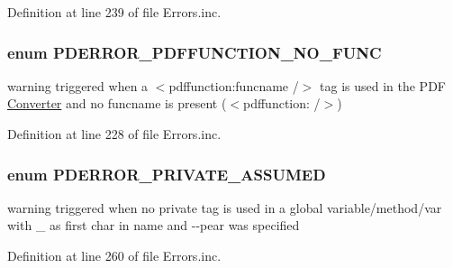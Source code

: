 \-Definition at line 239 of file \-Errors.\-inc.

\hypertarget{_errors_8inc_a8b308ece99eb09568c804c9188cf2409}{
\subsubsection[{\-P\-D\-E\-R\-R\-O\-R\-\_\-\-P\-D\-F\-F\-U\-N\-C\-T\-I\-O\-N\-\_\-\-N\-O\-\_\-\-F\-U\-N\-C}]{\setlength{\rightskip}{0pt plus 5cm}enum {\bf \-P\-D\-E\-R\-R\-O\-R\-\_\-\-P\-D\-F\-F\-U\-N\-C\-T\-I\-O\-N\-\_\-\-N\-O\-\_\-\-F\-U\-N\-C}}}\label{_errors_8inc_a8b308ece99eb09568c804c9188cf2409}
warning triggered when a $<$pdffunction\-:funcname /$>$ tag is used in the \-P\-D\-F \hyperlink{class_converter}{\-Converter} and no funcname is present ($<$pdffunction\-: /$>$) 

\-Definition at line 228 of file \-Errors.\-inc.

\hypertarget{_errors_8inc_a698a51197c0fd874d645fc4ddf3a7f84}{
\subsubsection[{\-P\-D\-E\-R\-R\-O\-R\-\_\-\-P\-R\-I\-V\-A\-T\-E\-\_\-\-A\-S\-S\-U\-M\-E\-D}]{\setlength{\rightskip}{0pt plus 5cm}enum {\bf \-P\-D\-E\-R\-R\-O\-R\-\_\-\-P\-R\-I\-V\-A\-T\-E\-\_\-\-A\-S\-S\-U\-M\-E\-D}}}\label{_errors_8inc_a698a51197c0fd874d645fc4ddf3a7f84}
warning triggered when no  private tag is used in a global variable/method/var with \-\_\- as first char in name and -\/-\/pear was specified 

\-Definition at line 260 of file \-Errors.\-inc.

